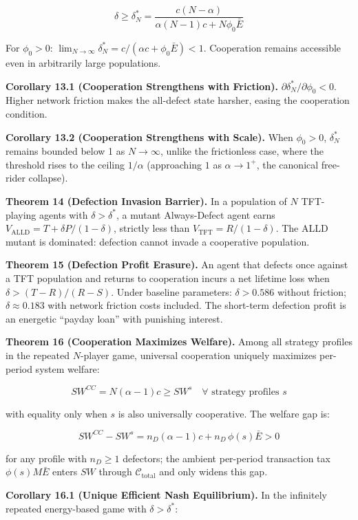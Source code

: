 \documentclass[11pt]{article}
\begin{document}
\[\delta \geq \delta_N^* = \frac{c(N - \alpha)}{\alpha(N-1)c + N\phi_0\bar{E}}\]

For \(\phi_0 > 0\):
\(\lim_{N \to \infty} \delta_N^* = c / (\alpha c + \phi_0 \bar{E}) < 1\).
Cooperation remains accessible even in arbitrarily large populations.

\textbf{Corollary 13.1 (Cooperation Strengthens with Friction).}
\(\partial \delta_N^* / \partial \phi_0 < 0\). Higher network friction
makes the all-defect state harsher, easing the cooperation condition.

\textbf{Corollary 13.2 (Cooperation Strengthens with Scale).} When
\(\phi_0 > 0\), \(\delta_N^*\) remains bounded below 1 as
\(N \to \infty\), unlike the frictionless case, where the threshold
rises to the ceiling \(1/\alpha\) (approaching \(1\) as
\(\alpha \to 1^+\), the canonical free-rider collapse).

\textbf{Theorem 14 (Defection Invasion Barrier).} In a population of
\(N\) TFT-playing agents with \(\delta > \delta^*\), a mutant
Always-Defect agent earns
\(V_{\text{ALLD}} = T + \delta P / (1 - \delta)\), strictly less than
\(V_{\text{TFT}} = R / (1 - \delta)\). The ALLD mutant is dominated:
defection cannot invade a cooperative population.

\textbf{Theorem 15 (Defection Profit Erasure).} An agent that defects
once against a TFT population and returns to cooperation incurs a net
lifetime loss when \(\delta > (T-R)/(R-S)\). Under baseline parameters:
\(\delta > 0.586\) without friction; \(\delta \approx 0.183\) with
network friction costs included. The short-term defection profit is an
energetic ``payday loan'' with punishing interest.

\textbf{Theorem 16 (Cooperation Maximizes Welfare).} Among all strategy
profiles in the repeated \(N\)-player game, universal cooperation
uniquely maximizes per-period system welfare:

\[SW^{CC} = N(\alpha - 1)c \geq SW^s \quad \forall \text{ strategy profiles } s\]

with equality only when \(s\) is also universally cooperative. The
welfare gap is:

\[SW^{CC} - SW^s = n_D(\alpha - 1)c + n_D\, \phi(s) \bar{E} > 0\]

for any profile with \(n_D \geq 1\) defectors; the ambient per-period
transaction tax \(\phi(s) M \bar{E}\) enters \(SW\) through
\(\mathcal{C}_{\text{total}}\) and only widens this gap.

\textbf{Corollary 16.1 (Unique Efficient Nash Equilibrium).} In the
infinitely repeated energy-based game with \(\delta > \delta^*\):
\end{document}
